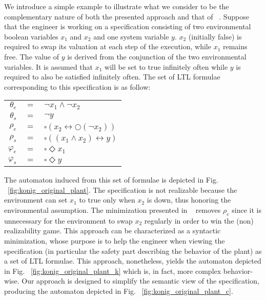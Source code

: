 We introduce a simple example to illustrate what we consider to be the complementary nature 
of both the presented approach and that of ~\cite{DBLP:conf/hvc/KonighoferHB10}. Suppose that the engineer is working on a specification consisting of two environmental boolean variables $x_1$ and $x_2$ and one system variable $y$. $x_2$ (initially false) is required to swap its valuation at each step of the execution, while $x_1$ remains free. The value of $y$ is derived from the conjunction of the two environmental variables.
It is assumed that $x_1$ will be set to true infinitely often while $y$ is required to also be satisfied infinitely often. The set of LTL formulae corresponding to this specification is as follow: 
\begin{center}
	\begin{tabular}{ r c l }
	$\theta_e$& $=$ &$\neg x_1 \wedge \neg x_2$\\
	$\theta_s$& $=$ &$\neg y$\\
	$\rho_e$& $=$ &$\square(x_2 \leftrightarrow \bigcirc(\neg x_2))$\\
	$\rho_s$& $=$ &$\square((x_1 \wedge x_2) \leftrightarrow y)$\\
	$\varphi_e$& $=$ &$\square \Diamond x_1$\\
	$\varphi_s$& $=$ &$\square \Diamond y$\\
\end{tabular}
\end{center}

The automaton induced from this set of formulae is depicted in Fig. ~\ref{fig:konig_original_plant}. The specification is not realizable because the environment can set $x_1$ to true only when $x_2$ is down, thus honoring the environmental assumption. The minimization presented in ~\cite{DBLP:conf/hvc/KonighoferHB10} removes $\rho_e$ since it is unnecessary for the environment to swap $x_2$ regularly in order to win the (non) realizability game. This approach can be characterized as a syntactic minimization, whose purpose is to help the engineer when viewing the specification (in particular the safety part describing the behavior of the plant) as a set of LTL formulae. This approach, nonetheless, yields the automaton depicted in Fig. ~\ref{fig:konig_original_plant_k} which is, in fact, more complex behavior-wise. Our approach is designed to simplify the semantic view of the specification, producing the automaton depicted in Fig. ~\ref{fig:konig_original_plant_c}. 

